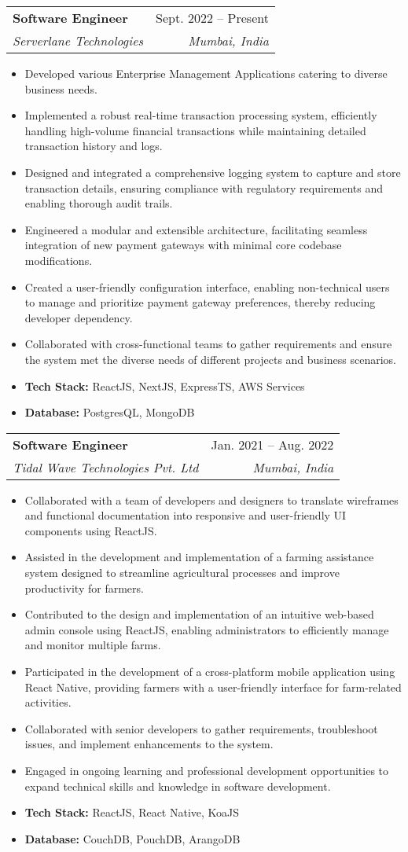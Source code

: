 \documentclass[letterpaper,11pt]{article}
\makeatletter
\newcommand{\resumeItem}[1]{
  \item\small{
    {#1 \vspace{-2pt}}
  }
}
\newcommand{\resumeSubheading}[4]{
  \vspace{-2pt}\item
    \begin{tabular*}{0.97\textwidth}[t]{l@{\extracolsep{\fill}}r}
      \textbf{#1} & #2 \\
      \textit{\small#3} & \textit{\small #4} \\
    \end{tabular*}\vspace{-7pt}
}
\newcommand{\resumeSubSubheading}[2]{ 
    \item
    \begin{tabular*}{0.97\textwidth}{l@{\extracolsep{\fill}}r}
      \textit{\small#1} & \textit{\small #2} \\
    \end{tabular*}\vspace{-7pt}
}
\newcommand{\resumeSubHeadingListEnd}{\end{itemize}}
\newcommand{\resumeItemListStart}{\begin{itemize}}
\newcommand{\resumeItemListEnd}{\end{itemize}\vspace{4pt}}
\makeatother
\begin{document}
      
    \resumeSubheading
      {Software Engineer}{Sept. 2022 -- Present}
      {Serverlane Technologies }{Mumbai, India}
      \resumeItemListStart
        \resumeItem{Developed various Enterprise Management Applications catering to diverse business needs.}
        \resumeItem{Implemented a robust real-time transaction processing system, efficiently handling high-volume financial transactions while maintaining detailed transaction history and logs.}
        \resumeItem{Designed and integrated a comprehensive logging system to capture and store transaction details, ensuring compliance with regulatory requirements and enabling thorough audit trails.}
        \resumeItem{Engineered a modular and extensible architecture, facilitating seamless integration of new payment gateways with minimal core codebase modifications.}
        \resumeItem{Created a user-friendly configuration interface, enabling non-technical users to manage and prioritize payment gateway preferences, thereby reducing developer dependency.}
        \resumeItem{Collaborated with cross-functional teams to gather requirements and ensure the system met the diverse needs of different projects and business scenarios.}
        \resumeItem{\textbf{Tech Stack: }{ReactJS, NextJS, ExpressTS, AWS Services}}
        \resumeItem{\textbf{Database: }{PostgresQL, MongoDB}}
    \resumeItemListEnd

    \resumeSubheading
      {Software Engineer}{Jan. 2021 -- Aug. 2022}
      {Tidal Wave Technologies Pvt. Ltd}{Mumbai, India}
      \resumeItemListStart
        \resumeItem{Collaborated with a team of developers and designers to translate wireframes and functional documentation into responsive and user-friendly UI components using ReactJS.}
        \resumeItem{Assisted in the development and implementation of a farming assistance system designed to streamline agricultural processes and improve productivity for farmers.}
        \resumeItem{Contributed to the design and implementation of an intuitive web-based admin console using ReactJS, enabling administrators to efficiently manage and monitor multiple farms.}
        \resumeItem{Participated in the development of a cross-platform mobile application using React Native, providing farmers with a user-friendly interface for farm-related activities.}
        \resumeItem{Collaborated with senior developers to gather requirements, troubleshoot issues, and implement enhancements to the system.}
        \resumeItem{Engaged in ongoing learning and professional development opportunities to expand technical skills and knowledge in software development.}
        \resumeItem{\textbf{Tech Stack: }{ReactJS, React Native, KoaJS}}
        \resumeItem{\textbf{Database: }{CouchDB, PouchDB, ArangoDB}}
    \resumeItemListEnd
\end{document}
